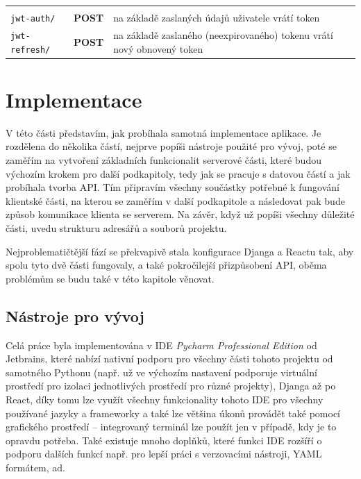             {\centering
            \begin{tabular}{p{\apiA\textwidth} p{\apiB\textwidth} p{\apiC\textwidth}}&&\\
                \verb|jwt-auth/|            & \textbf{POST}     & na základě zaslaných údajů uživatele vrátí token\\
                \verb|jwt-refresh/|         & \textbf{POST}     & na základě zaslaného (neexpirovaného) tokenu vrátí nový obnovený token\\
            \end{tabular}}
            
    
\chapter{Implementace}
V této části představím, jak probíhala samotná implementace aplikace. Je rozdělena do několika částí, nejprve popíši nástroje použité pro vývoj, poté se zaměřím na vytvoření základních funkcionalit serverové části, které budou výchozím krokem pro další podkapitoly, tedy jak se pracuje s datovou částí a jak probíhala tvorba API. Tím připravím všechny součástky potřebné k fungování klientské části, na kterou se zaměřím v další podkapitole a následovat pak bude způsob komunikace klienta se serverem. Na závěr, když už popíši všechny důležité části, uvedu strukturu adresářů a souborů projektu.

Nejproblematičtější fází se překvapivě stala konfigurace Djanga a Reactu tak, aby spolu tyto dvě části fungovaly, a také pokročilejší přizpůsobení API, oběma problémům se budu také v této kapitole věnovat.

    \section{Nástroje pro vývoj}\label{nastrojeprovyvoj}
    Celá práce byla implementována v IDE \textit{Pycharm Professional Edition} od Jetbrains, které nabízí nativní podporu pro všechny části tohoto projektu od samotného Pythonu (např. už ve výchozím nastavení podporuje virtuální prostředí pro izolaci jednotlivých prostředí pro různé projekty), Djanga až po React, díky tomu lze využít všechny funkcionality tohoto IDE pro všechny používané jazyky a frameworky a také lze většina úkonů provádět také pomocí grafického prostředí -- integrovaný terminál lze použít jen v případě, kdy je to opravdu potřeba. Také existuje mnoho doplňků, které funkci IDE rozšíří o podporu dalších funkcí např. pro lepší práci s verzovacími nástroji, YAML formátem, ad.
    
